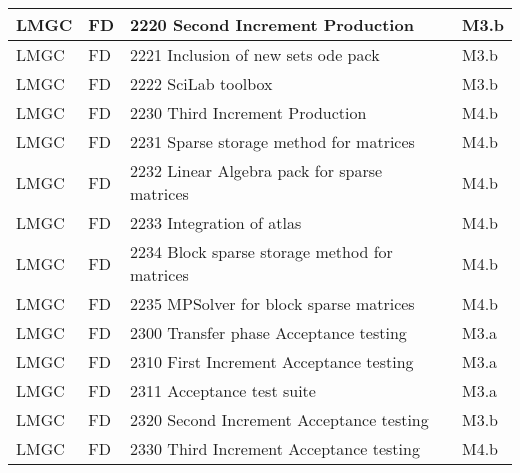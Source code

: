 \begin{longtable}{|l|l|l|l|}
  LMGC & FD &   2220 Second Increment Production        & M3.b \\ \hline
  LMGC & FD &   2221 Inclusion of new sets \ac{ode} pack& M3.b \\ \hline
  LMGC & FD &   2222 SciLab toolbox				        & M3.b \\ \hline
  LMGC & FD &   2230 Third Increment Production         & M4.b \\ \hline
  LMGC & FD &   2231 Sparse storage method for matrices & M4.b \\ \hline
  LMGC & FD &   2232 Linear Algebra pack for sparse matrices& M4.b \\ \hline
  LMGC & FD &   2233 Integration of \ac{atlas}		    & M4.b \\ \hline
  LMGC & FD &   2234 Block sparse storage method for matrices& M4.b \\ \hline
  LMGC & FD &   2235 MPSolver for block sparse matrices & M4.b \\ \hline
  LMGC & FD &   2300 Transfer phase Acceptance testing  & M3.a \\ \hline
  LMGC & FD &   2310 First Increment Acceptance testing & M3.a \\ \hline
  LMGC & FD &   2311 Acceptance test suite              & M3.a \\ \hline
  LMGC & FD &   2320 Second Increment Acceptance testing& M3.b \\ \hline
  LMGC & FD &   2330 Third Increment Acceptance testing & M4.b \\ \hline


\end{longtable}

